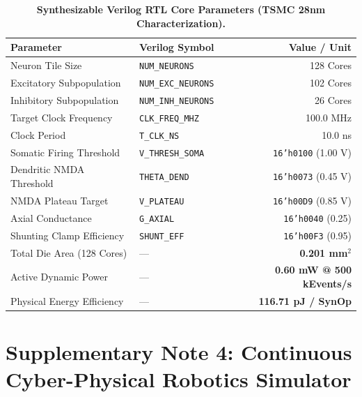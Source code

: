 \documentclass[10pt,letterpaper]{article}
\begin{document}
\begin{table}[h]
\centering
\small
\caption{\textbf{Synthesizable Verilog RTL Core Parameters (TSMC 28nm Characterization).}}
\begin{tabular}{llr}
\toprule
\textbf{Parameter} & \textbf{Verilog Symbol} & \textbf{Value / Unit} \\
\midrule
Neuron Tile Size & \texttt{NUM\_NEURONS} & 128 Cores \\
Excitatory Subpopulation & \texttt{NUM\_EXC\_NEURONS} & 102 Cores \\
Inhibitory Subpopulation & \texttt{NUM\_INH\_NEURONS} & 26 Cores \\
Target Clock Frequency & \texttt{CLK\_FREQ\_MHZ} & 100.0 MHz \\
Clock Period & \texttt{T\_CLK\_NS} & 10.0 ns \\
Somatic Firing Threshold & \texttt{V\_THRESH\_SOMA} & \texttt{16'h0100} (1.00 V) \\
Dendritic NMDA Threshold & \texttt{THETA\_DEND} & \texttt{16'h0073} (0.45 V) \\
NMDA Plateau Target & \texttt{V\_PLATEAU} & \texttt{16'h00D9} (0.85 V) \\
Axial Conductance & \texttt{G\_AXIAL} & \texttt{16'h0040} (0.25) \\
Shunting Clamp Efficiency & \texttt{SHUNT\_EFF} & \texttt{16'h00F3} (0.95) \\
Total Die Area (128 Cores) & --- & \textbf{0.201 mm$^2$} \\
Active Dynamic Power & --- & \textbf{0.60 mW @ 500 kEvents/s} \\
Physical Energy Efficiency & --- & \textbf{116.71 pJ / SynOp} \\
\bottomrule
\end{tabular}
\end{table}

\newpage

\section{Supplementary Note 4: Continuous Cyber-Physical Robotics Simulator}
\end{document}
